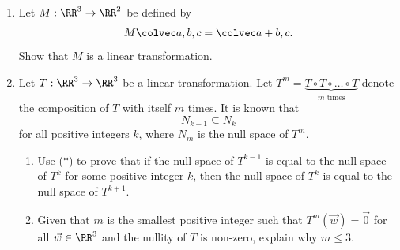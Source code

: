 \clearpage
\begin{problem}
    \begin{enumerate}
        \item Let $M : \RR^3 \to \RR^2$ be defined by \[M \cveciii{a}{b}{c} = \cvecii{a + b}{c}.\] Show that $M$ is a linear transformation.
        \item Let $T : \RR^3 \to \RR^3$ be a linear transformation. Let $T^m = \underbrace{T \circ T \circ \dots \circ T}_{\text{$m$ times}}$ denote the composition of $T$ with itself $m$ times. It is known that \[N_{k-1} \subseteq N_k \tag{$\ast$}\] for all positive integers $k$, where $N_m$ is the null space of $T^m$.
        \begin{enumerate}
            \item Use ($\ast$) to prove that if the null space of $T^{k-1}$ is equal to the null space of $T^k$ for some positive integer $k$, then the null space of $T^k$ is equal to the null space of $T^{k+1}$.
            \item Given that $m$ is the smallest positive integer such that $T^m(\vec w) = \vec 0$ for all $\vec w \in \RR^3$ and the nullity of $T$ is non-zero, explain why $m \leq 3$.
        \end{enumerate}
    \end{enumerate}
\end{problem}
